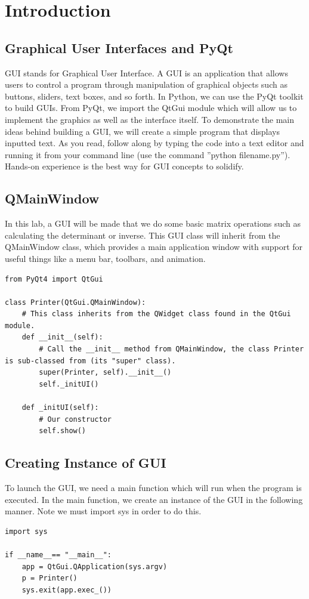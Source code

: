 \label{lab:OOP}

\section*{Introduction}
\subsection*{Graphical User Interfaces and PyQt}
GUI stands for Graphical User Interface.  A GUI is an application that allows users to control a program through manipulation of graphical objects such as buttons, sliders, text boxes, and so forth.  In Python, we can use the PyQt toolkit to build GUIs.  From PyQt, we import the QtGui module which will allow us to implement the graphics as well as the interface itself. To demonstrate the main ideas behind building a GUI, we will create a simple program that displays inputted text. As you read, follow along by typing the code into a text editor and running it from your command line (use the command ''python filename.py''). Hands-on experience is the best way for GUI concepts to solidify. 

\subsection*{QMainWindow}
In this lab, a GUI will be made that we do some basic matrix operations such as calculating the determinant or inverse.  This GUI class will inherit from the QMainWindow class, which provides a main application window with support for useful things like a menu bar, toolbars, and animation.

\begin{lstlisting}
from PyQt4 import QtGui

class Printer(QtGui.QMainWindow):
	# This class inherits from the QWidget class found in the QtGui module.
	def __init__(self):
		# Call the __init__ method from QMainWindow, the class Printer is sub-classed from (its "super" class).
		super(Printer, self).__init__()
		self._initUI()
	
	def _initUI(self):
		# Our constructor
		self.show()

\end{lstlisting}

\subsection*{Creating Instance of GUI}
To launch the GUI, we need a main function which will run when the program is executed.  In the main function, we create an instance of the GUI in the following manner.  Note we must import sys in order to do this.
\begin{lstlisting}
import sys

if __name__== "__main__":
    app = QtGui.QApplication(sys.argv)
    p = Printer()
    sys.exit(app.exec_())
\end{lstlisting}

